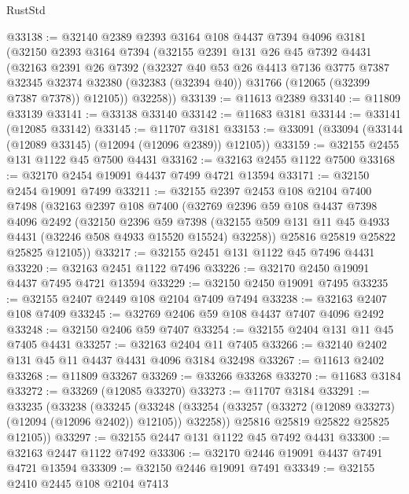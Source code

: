 \begin{lexlean}{RustStd}
\begin{coremodule}
@33138 := @32140
    @2389
    @2393
    @3164
    @108
    @4437
    @7394
    @4096
    @3181
    (@32150
      @2393
      @3164
      @7394
      (@32155
        @2391
        @131
        @26
        @45
        @7392
        @4431
        (@32163
          @2391
          @26
          @7392
          (@32327
            @40
            @53
            @26
            @4413
            @7136
            @3775
            @7387
            @32345
            @32374
            @32380
            (@32383 (@32394 @40))
            @31766
            (@12065 (@32399 @7387 @7378))
            @12105))
        @32258))
@33139 := @11613 @2389
@33140 := @11809 @33139
@33141 := @33138 @33140
@33142 := @11683 @3181
@33144 := @33141 (@12085 @33142)
@33145 := @11707 @3181
@33153 := @33091 (@33094 (@33144 (@12089 @33145) (@12094 (@12096 @2389)) @12105))
@33159 := @32155 @2455 @131 @1122 @45 @7500 @4431
@33162 := @32163 @2455 @1122 @7500
@33168 := @32170 @2454 @19091 @4437 @7499 @4721 @13594
@33171 := @32150 @2454 @19091 @7499
@33211 := @32155
    @2397
    @2453
    @108
    @2104
    @7400
    @7498
    (@32163
      @2397
      @108
      @7400
      (@32769
        @2396
        @59
        @108
        @4437
        @7398
        @4096
        @2492
        (@32150
          @2396
          @59
          @7398
          (@32155 @509 @131 @11 @45 @4933 @4431 (@32246 @508 @4933 @15520 @15524) @32258))
        @25816
        @25819
        @25822
        @25825
        @12105))
@33217 := @32155 @2451 @131 @1122 @45 @7496 @4431
@33220 := @32163 @2451 @1122 @7496
@33226 := @32170 @2450 @19091 @4437 @7495 @4721 @13594
@33229 := @32150 @2450 @19091 @7495
@33235 := @32155 @2407 @2449 @108 @2104 @7409 @7494
@33238 := @32163 @2407 @108 @7409
@33245 := @32769 @2406 @59 @108 @4437 @7407 @4096 @2492
@33248 := @32150 @2406 @59 @7407
@33254 := @32155 @2404 @131 @11 @45 @7405 @4431
@33257 := @32163 @2404 @11 @7405
@33266 := @32140 @2402 @131 @45 @11 @4437 @4431 @4096 @3184 @32498
@33267 := @11613 @2402
@33268 := @11809 @33267
@33269 := @33266 @33268
@33270 := @11683 @3184
@33272 := @33269 (@12085 @33270)
@33273 := @11707 @3184
@33291 := @33235
    (@33238
      (@33245
        (@33248 (@33254 (@33257 (@33272 (@12089 @33273) (@12094 (@12096 @2402)) @12105)) @32258))
        @25816
        @25819
        @25822
        @25825
        @12105))
@33297 := @32155 @2447 @131 @1122 @45 @7492 @4431
@33300 := @32163 @2447 @1122 @7492
@33306 := @32170 @2446 @19091 @4437 @7491 @4721 @13594
@33309 := @32150 @2446 @19091 @7491
@33349 := @32155
    @2410
    @2445
    @108
    @2104
    @7413

\end{coremodule}
\end{lexlean}

